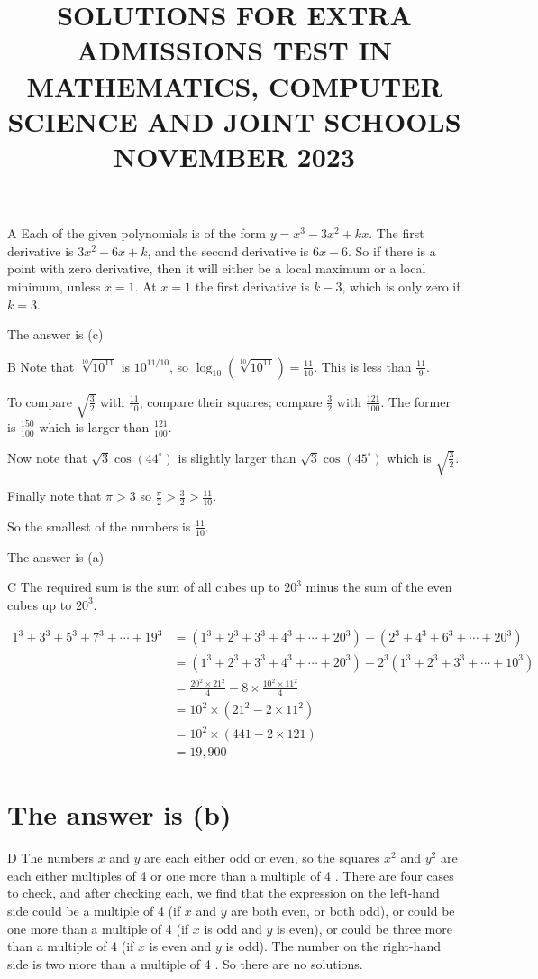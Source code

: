 \documentclass[10pt]{article}
\title{SOLUTIONS FOR EXTRA ADMISSIONS TEST IN MATHEMATICS, COMPUTER SCIENCE AND JOINT SCHOOLS NOVEMBER 2023 }
\author{}
\date{}
\begin{document}
\maketitle
A Each of the given polynomials is of the form $y=x^{3}-3 x^{2}+k x$. The first derivative is $3 x^{2}-6 x+k$, and the second derivative is $6 x-6$. So if there is a point with zero derivative, then it will either be a local maximum or a local minimum, unless $x=1$. At $x=1$ the first derivative is $k-3$, which is only zero if $k=3$.

The answer is (c)

B Note that $\sqrt[10]{10^{11}}$ is $10^{11 / 10}$, so $\log _{10}\left(\sqrt[10]{10^{11}}\right)=\frac{11}{10}$. This is less than $\frac{11}{9}$.

To compare $\sqrt{\frac{3}{2}}$ with $\frac{11}{10}$, compare their squares; compare $\frac{3}{2}$ with $\frac{121}{100}$. The former is $\frac{150}{100}$ which is larger than $\frac{121}{100}$.

Now note that $\sqrt{3} \cos \left(44^{\circ}\right)$ is slightly larger than $\sqrt{3} \cos \left(45^{\circ}\right)$ which is $\sqrt{\frac{3}{2}}$.

Finally note that $\pi>3$ so $\frac{\pi}{2}>\frac{3}{2}>\frac{11}{10}$.

So the smallest of the numbers is $\frac{11}{10}$.

The answer is (a)

C The required sum is the sum of all cubes up to $20^{3}$ minus the sum of the even cubes up to $20^{3}$.

$$
\begin{aligned}
1^{3}+3^{3}+5^{3}+7^{3}+\cdots+19^{3} & =\left(1^{3}+2^{3}+3^{3}+4^{3}+\cdots+20^{3}\right)-\left(2^{3}+4^{3}+6^{3}+\cdots+20^{3}\right) \\
& =\left(1^{3}+2^{3}+3^{3}+4^{3}+\cdots+20^{3}\right)-2^{3}\left(1^{3}+2^{3}+3^{3}+\cdots+10^{3}\right) \\
& =\frac{20^{2} \times 21^{2}}{4}-8 \times \frac{10^{2} \times 11^{2}}{4} \\
& =10^{2} \times\left(21^{2}-2 \times 11^{2}\right) \\
& =10^{2} \times(441-2 \times 121) \\
& =19,900
\end{aligned}
$$

\section*{The answer is (b)}
D The numbers $x$ and $y$ are each either odd or even, so the squares $x^{2}$ and $y^{2}$ are each either multiples of 4 or one more than a multiple of 4 . There are four cases to check, and after checking each, we find that the expression on the left-hand side could be a multiple of 4 (if $x$ and $y$ are both even, or both odd), or could be one more than a multiple of 4 (if $x$ is odd and $y$ is even), or could be three more than a multiple of 4 (if $x$ is even and $y$ is odd). The number on the right-hand side is two more than a multiple of 4 . So there are no solutions.
\end{document}
